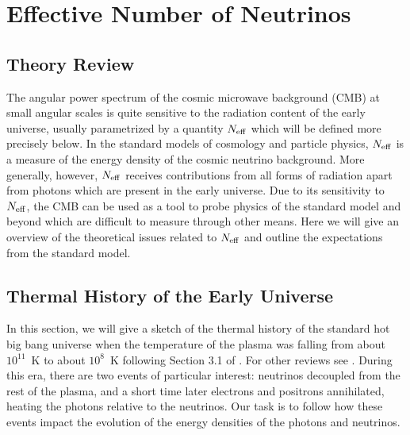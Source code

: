 \section{Effective Number of Neutrinos}

\subsection{Theory Review}

The angular power spectrum of the cosmic microwave background (CMB) at small angular scales is quite sensitive to the radiation content of the early universe, usually parametrized by a quantity $N_{\rm eff}$ which will be defined more precisely below.  In the standard models of cosmology and particle physics, $N_{\rm eff}$ is a measure of the energy density of the cosmic neutrino background.  More generally, however, $N_{\rm eff}$ receives contributions from all forms of radiation apart from photons which are present in the early universe.  Due to its sensitivity to $N_{\rm eff}$, the CMB can be used as a tool to probe physics of the standard model and beyond which are difficult to measure through other means.  Here we will give an overview of the theoretical issues related to $N_{\rm eff}$ and outline the expectations from the standard model.

\subsection{Thermal History of the Early Universe} \label{ThermalHistory}
In this section, we will give a sketch of the thermal history of the standard hot big bang universe when the temperature of the plasma was falling from about $10^{11}$~K to about $10^8$~K following Section 3.1 of \cite{Weinberg:2008zzc}.  For other reviews see \cite{Dolgov:2002wy,Agashe:2014kda}.  During this era, there are two events of particular interest: neutrinos decoupled from the rest of the plasma, and a short time later electrons and positrons annihilated, heating the photons relative to the neutrinos.  Our task is to follow how these events impact the evolution of the energy densities of the photons and neutrinos.

